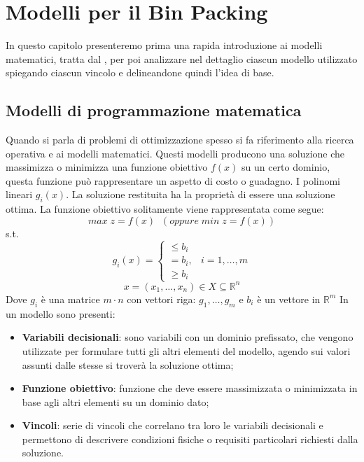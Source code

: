 
\hypertarget{(chap:capitolo4)}{}
\chapter{Modelli per il Bin Packing}
In questo capitolo presenteremo prima una rapida introduzione ai modelli matematici, tratta dal , per poi analizzare nel dettaglio ciascun modello utilizzato spiegando ciascun vincolo e delineandone quindi l'idea di base.
\section{Modelli di programmazione matematica}
Quando si parla di problemi di ottimizzazione spesso si fa riferimento alla ricerca operativa e ai modelli matematici. Questi modelli producono una soluzione che massimizza o minimizza una funzione obiettivo $f ( x ) $ su un certo dominio, questa funzione può rappresentare un aspetto di costo o guadagno. I polinomi lineari $g_{i} (x)$. 		 
La soluzione restituita ha la proprietà di essere una soluzione ottima. La funzione obiettivo solitamente viene rappresentata come segue:
$$ max\; z = f ( x )\;\; (oppure\; min\; z = f ( x ))$$
s.t.
$$g_i (x) = \begin{cases} \leq b_i \\ = b_i, & i = 1,\dots,m \\ \geq b_i \end{cases}$$
$$x = (x_1,\dots,x_n) \in X \subseteq \mathbb{R}^n$$
Dove $g_i$ è una matrice $m \cdot n$ con vettori riga: $g_1,\dots,g_m$ e $b_i$ è un vettore in $\mathbb{R}^{m}$
In un modello sono presenti:
\begin{itemize}
	\item \textbf{Variabili decisionali}: sono variabili con un dominio prefissato, che vengono utilizzate per formulare tutti gli altri elementi del modello, agendo sui valori assunti dalle stesse si troverà la soluzione ottima;
	\item \textbf{Funzione obiettivo}: funzione che deve essere massimizzata o minimizzata in base agli altri elementi su un dominio dato;
	\item \textbf{Vincoli}: serie di vincoli che correlano tra loro le variabili decisionali e permettono di descrivere condizioni fisiche o requisiti particolari richiesti dalla soluzione.
\end{itemize}
